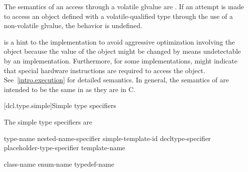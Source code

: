 \pnum
The semantics of an access through a volatile glvalue are
.
If an attempt is made to access an object defined with a
volatile-qualified type through the use of a non-volatile glvalue,
the behavior is undefined.

\pnum
{}%
%
\begin{note}
 is a hint to the implementation to avoid aggressive
optimization involving the object because the value of the object might
be changed by means undetectable by an implementation.
Furthermore, for some implementations,  might indicate that
special hardware instructions are required to access the object.
See~\ref{intro.execution} for detailed semantics. In general, the
semantics of  are intended to be the same in \Cpp{} as
they are in C.
\end{note}

[dcl.type.simple]{Simple type specifiers}%

\pnum
The simple type specifiers are

\begin{bnf}
\br
     type-name\br
    nested-name-specifier  simple-template-id\br
    decltype-specifier\br
    placeholder-type-specifier\br
     template-name\br
    \br
    \br
    \br
    \br
    \br
    \br
    \br
    \br
    \br
    \br
    \br
    \br
    \br
\end{bnf}

\begin{bnf}
\br
    class-name\br
    enum-name\br
    typedef-name
\end{bnf}

